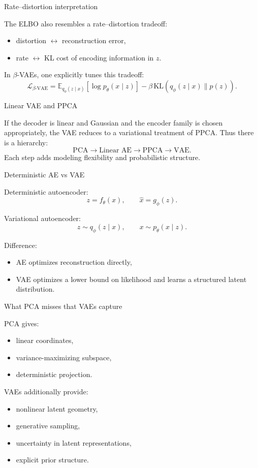 \documentclass[aspectratio=169]{beamer}
\begin{document}
\begin{frame}{Rate--distortion interpretation}

The ELBO also resembles a rate--distortion tradeoff:
\begin{itemize}
\item distortion \(\leftrightarrow\) reconstruction error,
\item rate \(\leftrightarrow\) KL cost of encoding information in \(z\).
\end{itemize}
In \(\beta\)-VAEs, one explicitly tunes this tradeoff:
\[
\mathcal{L}_{\beta\text{-VAE}}
=
\mathbb{E}_{q_\phi(z\mid x)}[\log p_\theta(x\mid z)]
-
\beta\, \mathrm{KL}(q_\phi(z\mid x)\|p(z)).
\]

\end{frame}

\begin{frame}{Linear VAE and PPCA}

If the decoder is linear and Gaussian and the encoder family is chosen appropriately, the VAE reduces to a variational treatment of PPCA.
Thus there is a hierarchy:
\[
\text{PCA}
\longrightarrow
\text{Linear AE}
\longrightarrow
\text{PPCA}
\longrightarrow
\text{VAE}.
\]
Each step adds modeling flexibility and probabilistic structure.

\end{frame}

\begin{frame}{Deterministic AE vs VAE}

Deterministic autoencoder:
\[
z=f_\theta(x),\qquad \hat x = g_\phi(z).
\]

Variational autoencoder:
\[
z\sim q_\phi(z\mid x),\qquad x\sim p_\theta(x\mid z).
\]

Difference:
\begin{itemize}
\item AE optimizes reconstruction directly,
\item VAE optimizes a lower bound on likelihood and learns a structured latent distribution.
\end{itemize}

\end{frame}

\begin{frame}{What PCA misses that VAEs capture}

PCA gives:
\begin{itemize}
\item linear coordinates,
\item variance-maximizing subspace,
\item deterministic projection.
\end{itemize}

VAEs additionally provide:
\begin{itemize}
\item nonlinear latent geometry,
\item generative sampling,
\item uncertainty in latent representations,
\item explicit prior structure.
\end{itemize}

\end{frame}
\end{document}
